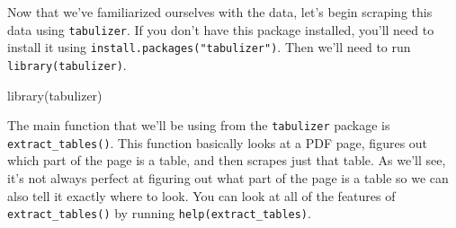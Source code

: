 \documentclass[
  12pt,
]{book}
\newenvironment{Shaded}{\begin{snugshade}}{\end{snugshade}}
\newcommand{\FunctionTok}[1]{\textcolor[rgb]{0,0,0}{#1}}
\newcommand{\NormalTok}[1]{#1}
\begin{document}
Now that we've familiarized ourselves with the data, let's begin scraping this data using \texttt{tabulizer}. If you don't have this package installed, you'll need to install it using \texttt{install.packages("tabulizer")}. Then we'll need to run \texttt{library(tabulizer)}.

\begin{Shaded}
\begin{Highlighting}[]
\FunctionTok{library}\NormalTok{(tabulizer)}
\end{Highlighting}
\end{Shaded}

The main function that we'll be using from the \texttt{tabulizer} package is \texttt{extract\_tables()}. This function basically looks at a PDF page, figures out which part of the page is a table, and then scrapes just that table. As we'll see, it's not always perfect at figuring out what part of the page is a table so we can also tell it exactly where to look. You can look at all of the features of \texttt{extract\_tables()} by running \texttt{help(extract\_tables)}.
\end{document}
